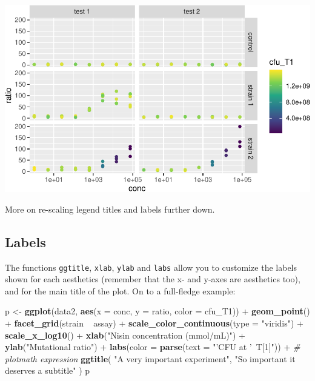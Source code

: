 \documentclass[]{book}
\newenvironment{Shaded}{}{}
\newcommand{\CommentTok}[1]{\textcolor[rgb]{0.38,0.63,0.69}{\textit{#1}}}
\newcommand{\DataTypeTok}[1]{\textcolor[rgb]{0.56,0.13,0.00}{#1}}
\newcommand{\KeywordTok}[1]{\textcolor[rgb]{0.00,0.44,0.13}{\textbf{#1}}}
\newcommand{\NormalTok}[1]{#1}
\newcommand{\OperatorTok}[1]{\textcolor[rgb]{0.40,0.40,0.40}{#1}}
\newcommand{\StringTok}[1]{\textcolor[rgb]{0.25,0.44,0.63}{#1}}
\begin{document}
\begin{center}\includegraphics[width=\textwidth]{TRES-Tidy-Tutorial_files/figure-latex/unnamed-chunk-142-1} \end{center}

More on re-scaling legend titles and labels further down.

\hypertarget{labels}{%
\subsection{Labels}\label{labels}}

The functions \texttt{ggtitle}, \texttt{xlab}, \texttt{ylab} and \texttt{labs} allow you to customize the labels shown for each aesthetics (remember that the x- and y-axes are aesthetics too), and for the main title of the plot. On to a full-fledge example:

\begin{Shaded}
\begin{Highlighting}[]
\NormalTok{p <-}\StringTok{ }\KeywordTok{ggplot}\NormalTok{(data2, }\KeywordTok{aes}\NormalTok{(}\DataTypeTok{x =}\NormalTok{ conc, }\DataTypeTok{y =}\NormalTok{ ratio, }\DataTypeTok{color =}\NormalTok{ cfu_T1)) }\OperatorTok{+}
\StringTok{  }\KeywordTok{geom_point}\NormalTok{() }\OperatorTok{+}
\StringTok{  }\KeywordTok{facet_grid}\NormalTok{(strain }\OperatorTok{~}\StringTok{ }\NormalTok{assay) }\OperatorTok{+}
\StringTok{  }\KeywordTok{scale_color_continuous}\NormalTok{(}\DataTypeTok{type =} \StringTok{"viridis"}\NormalTok{) }\OperatorTok{+}
\StringTok{  }\KeywordTok{scale_x_log10}\NormalTok{() }\OperatorTok{+}
\StringTok{  }\KeywordTok{xlab}\NormalTok{(}\StringTok{"Nisin concentration (mmol/mL)"}\NormalTok{) }\OperatorTok{+}
\StringTok{  }\KeywordTok{ylab}\NormalTok{(}\StringTok{"Mutational ratio"}\NormalTok{) }\OperatorTok{+}
\StringTok{  }\KeywordTok{labs}\NormalTok{(}\DataTypeTok{color =} \KeywordTok{parse}\NormalTok{(}\DataTypeTok{text =} \StringTok{"'CFU at '~T[1]"}\NormalTok{)) }\OperatorTok{+}\StringTok{ }\CommentTok{# plotmath expression}
\StringTok{  }\KeywordTok{ggtitle}\NormalTok{(}
    \StringTok{"A very important experiment"}\NormalTok{, }
    \StringTok{"So important it deserves a subtitle"}
\NormalTok{  )}
\NormalTok{p}
\end{Highlighting}
\end{Shaded}
\end{document}
